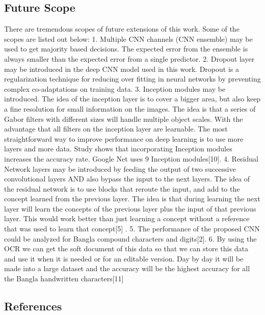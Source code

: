 \documentclass{article}
\begin{document}
\subsection{Future Scope}
There are tremendous scopes of future extensions of this work. Some of the scopes are listed out below: 
1.	 Multiple CNN channels (CNN ensemble) may be used to get majority based decisions. The expected error from the ensemble is always smaller than the expected error from a single predictor. 
2.	Dropout layer may be introduced in the deep CNN model used in this work. Dropout is a regularization technique for reducing over fitting in neural networks by preventing complex co-adaptations on training data. 
3.	Inception modules may be introduced. The idea of the inception layer is to cover a bigger area, but also keep a fine resolution for small information on the images. The idea is that a series of Gabor filters with different sizes will handle multiple object scales. With the advantage that all filters on the inception layer are learnable. The most straightforward way to improve performance on deep learning is to use more layers and more data. Study shows that incorporating Inception modules increases the accuracy rate. Google Net uses 9 Inception modules[10].
4.	Residual Network layers may be introduced by feeding the output of two successive convolutional layers AND also bypass the input to the next layers. The idea of the residual network is to use blocks that reroute the input, and add to the concept learned from the previous layer. The idea is that during learning the next layer will learn the concepts of the previous layer plus the input of that previous layer. This would work better than just learning a concept without a reference that was used to learn that concept[5] .
5.	The performance of the proposed CNN could be analyzed for Bangla compound characters and digits[2].
6.	By using the OCR we can get the soft document of this data so that we can store this data and use it when it is needed or for an editable version. Day by day it will be made into a large dataset and the accuracy will be the highest accuracy for all the Bangla handwritten characters[11]
 


\subsection{References}
\end{document}
